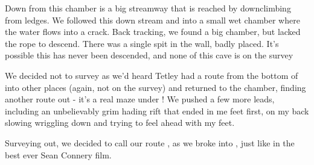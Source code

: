 Down from this chamber is a big streamway that is reached by downclimbing from ledges. We followed this down stream and into a small wet chamber where the water flows into a crack. Back tracking, we found a big chamber, but lacked the rope to descend. There was a single spit in the wall, badly placed. It's possible this has never been descended, and none of this cave is on the survey

We decided not to survey as we'd heard Tetley had a route from the bottom of  into other places (again, not on the survey) and returned to the chamber, finding another route out - it's a real maze under ! We pushed a few more leads, including an unbelievably grim hading rift that ended in me feet first, on my back slowing wriggling down and trying to feel ahead with my feet.

Surveying out, we decided to call our route , as we broke into , just like in the best ever Sean Connery film.

